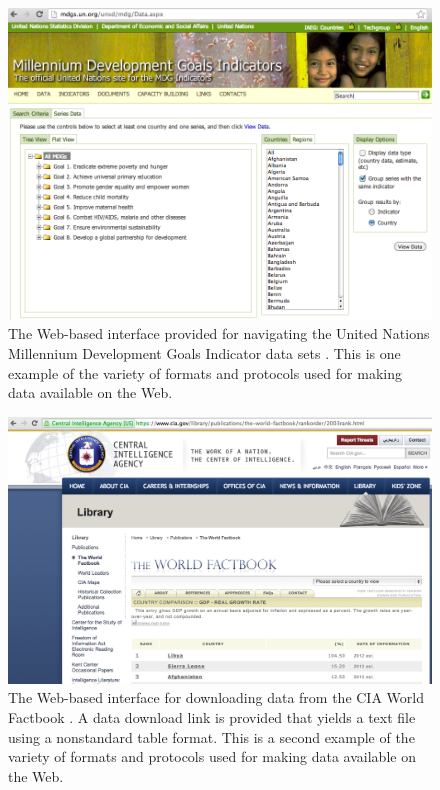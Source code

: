 \begin{figure}
  \centering
  \includegraphics[width=\figureWidth]{figs/MDGInterface.png}
  \caption[Millennium Development Goals User Interface.]
   {The Web-based interface provided for navigating the United Nations Millennium Development Goals Indicator data sets \cite{mdgDataUI}. This is one example of the variety of formats and protocols used for making data available on the Web.}
  \label{fig:MDGInterface}
\end{figure}

\begin{figure}
  \centering
  \includegraphics[width=\figureWidth]{figs/CIAWorldFactbook.png}
  \caption[CIA World Factbook User Interface.]
    {The Web-based interface for downloading data from the CIA World Factbook \cite{ciaWorldFactbookData}. A data download link is provided that yields a text file using a nonstandard table format. This is a second example of the variety of formats and protocols used for making data available on the Web.}
  \label{fig:ciaWorldFactbook}
\end{figure}

